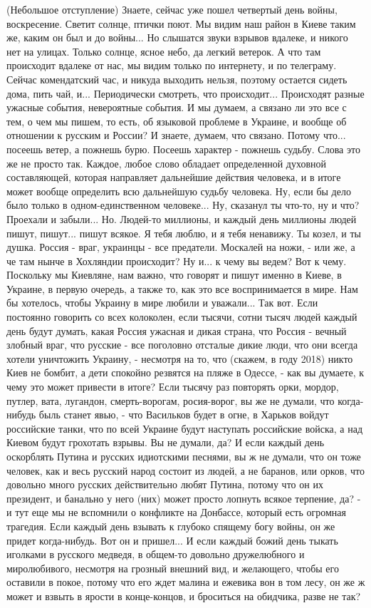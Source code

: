 (Небольшое отступление) Знаете, сейчас уже пошел четвертый день войны,
воскресение. Светит солнце, птички поют. Мы видим наш район в Киеве таким же,
каким он был и до войны...  Но слышатся звуки взрывов вдалеке, и никого нет на
улицах. Только солнце, ясное небо, да легкий ветерок.  А что там происходит
вдалеке от нас, мы видим только по интернету, и по телеграму.  Сейчас
комендатский час, и никуда выходить нельзя, поэтому остается сидеть дома, пить
чай, и...  Периодически смотреть, что происходит...  Происходят разные ужасные
события, невероятные события. И мы думаем, а связано ли это все с тем, о чем мы
пишем, то есть, об языковой проблеме в Украине, и вообще об отношении к русским
и России? И знаете, думаем, что связано. Потому что...  посеешь ветер, а
пожнешь бурю. Посеешь характер - пожнешь судьбу. Слова это же не просто так.
Каждое, любое слово обладает определенной духовной составляющей, которая
направляет дальнейшие действия человека, и в итоге может вообще определить всю
дальнейшую судьбу человека. Ну, если бы дело было только в одном-единственном
человеке... Ну, сказанул ты что-то, ну и что? Проехали и забыли... Но. Людей-то
миллионы, и каждый день миллионы людей пишут, пишут...  пишут всякое. Я тебя
люблю, и я тебя ненавижу.  Ты козел, и ты душка. Россия - враг, украинцы - все
предатели. Москалей на ножи, - или же, а че там нынче в Хохляндии происходит?
Ну и... к чему вы ведем? Вот к чему. Поскольку мы Киевляне, нам важно, что
говорят и пишут именно в Киеве, в Украине, в первую очередь, а также то, как
это все воспринимается в мире. Нам бы хотелось, чтобы Украину в мире любили и
уважали... Так вот. Если постоянно говорить со всех колоколен, если тысячи,
сотни тысяч людей каждый день будут думать, какая Россия ужасная и дикая
страна, что Россия - вечный злобный враг, что русские - все поголовно отсталые
дикие люди, что они всегда хотели уничтожить Украину, - несмотря на то, что
(скажем, в году 2018) никто Киев не бомбит, а дети спокойно резвятся на пляже в
Одессе, - как вы думаете, к чему это может привести в итоге? Если тысячу раз
повторять орки, мордор, путлер, вата, лугандон, смерть-ворогам, росия-ворог, вы
же не думали, что когда-нибудь быль станет явью, - что Васильков будет в огне,
в Харьков войдут российские танки, что по всей Украине будут наступать
российские войска, а над Киевом будут грохотать взрывы. Вы не думали, да? И
если каждый день оскорблять Путина и русских идиотскими песнями, вы ж не
думали, что он тоже человек, как и весь русский народ состоит из людей, а не
баранов, или орков, что довольно много русских действительно любят Путина,
потому что он их президент, и банально у него (них) может просто лопнуть всякое
терпение, да? -  и тут еще мы не вспомнили о конфликте на Донбассе, который
есть огромная трагедия. Если каждый день взывать к глубоко спящему богу войны,
он же придет когда-нибудь.  Вот он и пришел... И если каждый божий день тыкать
иголками в русского медведя, в общем-то довольно дружелюбного и миролюбивого,
несмотря на грозный внешний вид, и желающего, чтобы его оставили в покое,
потому что его ждет малина и ежевика вон в том лесу, он же ж может и взвыть в
ярости в конце-концов, и броситься на обидчика, разве не так?

